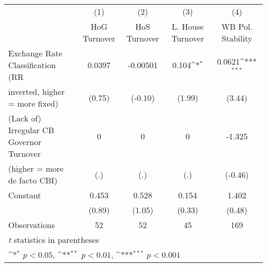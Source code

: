 \begin{table}[htbp]\centering
\def\sym#1{\ifmmode^{#1}\else\(^{#1}\)\fi}
\caption{\label{hiKfivs4}}
\begin{tabular}{l*{4}{c}}
\toprule
                                        &\multicolumn{1}{c}{(1)}&\multicolumn{1}{c}{(2)}&\multicolumn{1}{c}{(3)}&\multicolumn{1}{c}{(4)}\\
                                        &\multicolumn{1}{c}{HoG Turnover}&\multicolumn{1}{c}{HoS Turnover}&\multicolumn{1}{c}{L. House Turnover}&\multicolumn{1}{c}{WB Pol. Stability}\\
\midrule
Exchange Rate Classification (RR        &   0.0397         & -0.00501         &    0.104\sym{*}  &   0.0621\sym{***}\\
inverted, higher = more fixed)          &   (0.75)         &  (-0.10)         &   (1.99)         &   (3.44)         \\
\addlinespace
(Lack of) Irregular CB Governor Turnover&        0         &        0         &        0         &   -1.325         \\
(higher = more de facto CBI)            &      (.)         &      (.)         &      (.)         &  (-0.46)         \\
\addlinespace
Constant                                &    0.453         &    0.528         &    0.154         &    1.402         \\
                                        &   (0.89)         &   (1.05)         &   (0.33)         &   (0.48)         \\
\midrule
Observations                            &       52         &       52         &       45         &      169         \\
\bottomrule
\multicolumn{5}{l}{\footnotesize \textit{t} statistics in parentheses}\\
\multicolumn{5}{l}{\footnotesize \sym{*} \(p<0.05\), \sym{**} \(p<0.01\), \sym{***} \(p<0.001\)}\\
\end{tabular}
\end{table}
